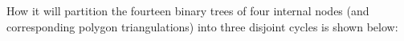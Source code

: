 \documentclass[11pt]{article} %
\begin{document}





How it will partition the fourteen binary trees of four internal nodes (and
corresponding polygon triangulations) into three disjoint cycles is shown below:
\end{document}
